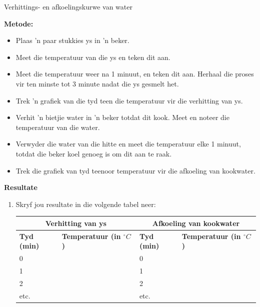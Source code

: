 \begin{f_experiment}{Verhittings- en afkoelingskurwe van water}
{\label{m38736*eip-862}\noindent{}\textbf{Metode:}
\label{m38736*id9872}\begin{itemize}[noitemsep]
            \item Plaas 'n paar stukkies ys in 'n beker.
\item Meet die temperatuur van die ys en teken dit aan.
\item Meet die temperatuur weer na 1 minuut, en teken dit aan. Herhaal die proses vir ten minste tot 3 minute nadat die ys gesmelt het.
\item Trek 'n grafiek van die tyd teen die temperatuur vir die verhitting van ys. 
\item Verhit 'n bietjie water in 'n beker totdat dit kook. Meet en noteer die temperatuur van die water.
\item Verwyder die water van die hitte en meet die temperatuur elke 1 minuut, totdat die beker koel genoeg is om dit aan te raak.
\item Trek die grafiek van tyd teenoor temperatuur vir die afkoeling van kookwater. 
\end{itemize}
\label{m38736*eip-282}
	\par 
      \label{m38736*eip-863}\noindent{}\textbf{Resultate} \\
\begin{enumerate}[noitemsep, label=\textbf{\arabic*}.]
\item Skryf jou resultate in die volgende tabel neer: \\
          \begin{table}[H]
        \begin{center}
      \label{m38736*uid434}
    \noindent
      \begin{tabular}{|l|l|l|l|}\hline
\multicolumn{2}{|c|}{Verhitting van ys} & \multicolumn{2}{|c|}{Afkoeling van kookwater}  \\ \hline
 \textbf{Tyd (min)} & \textbf{Temperatuur (in $^{\circ} C$)} &  \textbf{Tyd (min)} & \textbf{Temperatuur (in $^{\circ} C$)} \\ \hline
     0    & & 0    & \\ \hline 
     1    & & 1    & \\ \hline
     2    & & 2    & \\ \hline
     etc. & & etc. & \\ \hline

\end{tabular}
\end{center}
\end{table}
\end{enumerate}}
\end{f_experiment}

